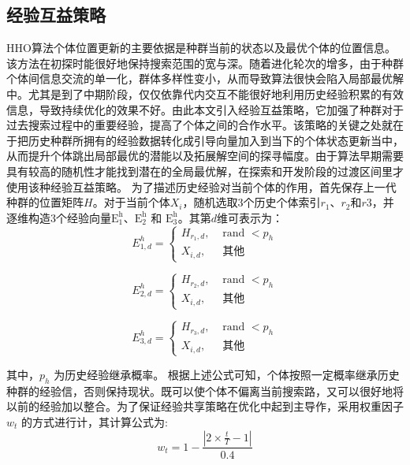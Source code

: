 \documentclass{wzuthesis}
\begin{document}
\subsection{经验互益策略}
HHO算法个体位置更新的主要依据是种群当前的状态以及最优个体的位置信息。该方法在初探时能很好地保持搜索范围的宽与深。随着进化轮次的增多，由于种群个体间信息交流的单一化，群体多样性变小，从而导致算法很快会陷入局部最优解中。尤其是到了中期阶段，仅仅依靠代内交互不能很好地利用历史经验积累的有效信息，导致持续优化的效果不好。由此本文引入经验互益策略，它加强了种群对于过去搜索过程中的重要经验，提高了个体之间的合作水平。该策略的关键之处就在于把历史种群所拥有的经验数据转化成引导向量加入到当下的个体状态更新当中，从而提升个体跳出局部最优的潜能以及拓展解空间的探寻幅度。由于算法早期需要具有较高的随机性才能找到潜在的全局最优解，在探索和开发阶段的过渡区间里才使用该种经验互益策略。
为了描述历史经验对当前个体的作用，首先保存上一代种群的位置矩阵$H$。对于当前个体$X_i$，随机选取3个历史个体索引$r_1$、$r_2$和$r3$，并逐维构造3个经验向量${\mathrm{E}}_{1}^{\mathrm{h}}$、${\mathrm{E}}_{2}^{\mathrm{h}}$ 和 ${\mathrm{E}}_{3}^{\mathrm{h}}$。其第$d$维可表示为：
\begin{equation}
    {E}_{1,d}^{h} = \left\{  \begin{array}{ll} {H}_{{r}_{1},d}, & \text{ rand } < {p}_{h} \\  {X}_{i,d}, & \text{ 其他 } \end{array}\right.
\end{equation}

\begin{equation}
    {E}_{2,d}^{h} = \left\{  \begin{array}{ll} {H}_{{r}_{2},d}, & \text{ rand } < {p}_{h} \\  {X}_{i,d}, & \text{ 其他 } \end{array}\right.
\end{equation}

\begin{equation}
    {E}_{3,d}^{h} = \left\{  \begin{array}{ll} {H}_{{r}_{3},d}, & \text{ rand } < {p}_{h} \\  {X}_{i,d}, & \text{ 其他 } \end{array}\right.
\end{equation}

其中，${p}_{h}$ 为历史经验继承概率。
根据上述公式可知，个体按照一定概率继承历史种群的经验信，否则保持现状。既可以使个体不偏离当前搜索路，又可以很好地将以前的经验加以整合。为了保证经验共享策略在优化中起到主导作，采用权重因子 ${w}_{t}$ 的方式进行计，其计算公式为:
\begin{equation}
    {w}_{t} = 1 - \frac{\left| 2 \times  \frac{t}{T} - 1\right| }{0.4}
\end{equation}
\end{document}
